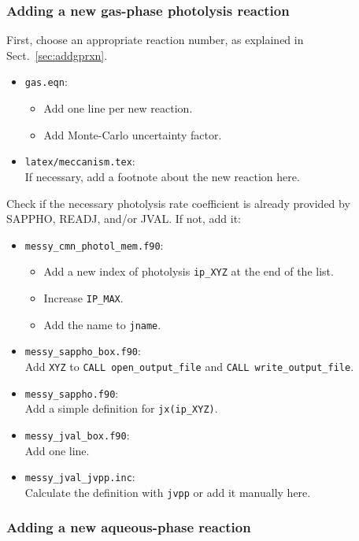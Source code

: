 \documentclass[twoside]{article}
\def\nosep{\setlength\parsep{0mm}\setlength\topsep{0mm}\setlength\itemsep{0mm}}
\begin{document}
\subsubsection{Adding a new gas-phase photolysis reaction}

First, choose an appropriate reaction number, as explained in
Sect.~\ref{sec:addgprxn}.

\begin{itemize}\nosep
\item \verb|gas.eqn|:
  \begin{itemize}
  \item Add one line per new reaction.
  \item Add Monte-Carlo uncertainty factor.
  \end{itemize}
\item \verb|latex/meccanism.tex|:\\
  If necessary, add a footnote about the new reaction here.
\end{itemize}

Check if the necessary photolysis rate coefficient is already provided
by SAPPHO, READJ, and/or JVAL. If not, add it:

\begin{itemize}\nosep
\item \verb|messy_cmn_photol_mem.f90|:
  \begin{itemize}\nosep
  \item Add a new index of photolysis \verb|ip_XYZ| at the end of the
    list.
  \item Increase \verb|IP_MAX|.
  \item Add the name to \verb|jname|.
  \end{itemize}
\item \verb|messy_sappho_box.f90|:\\
  Add \verb|XYZ| to \verb|CALL open_output_file| and
  \verb|CALL write_output_file|.
\item \verb|messy_sappho.f90|:\\
  Add a simple definition for \verb|jx(ip_XYZ)|.
\item \verb|messy_jval_box.f90|:\\
  Add one line.
\item \verb|messy_jval_jvpp.inc|:\\
  Calculate the definition with \verb|jvpp| or add it manually here.
\end{itemize}

\subsubsection{Adding a new aqueous-phase reaction}
\end{document}

